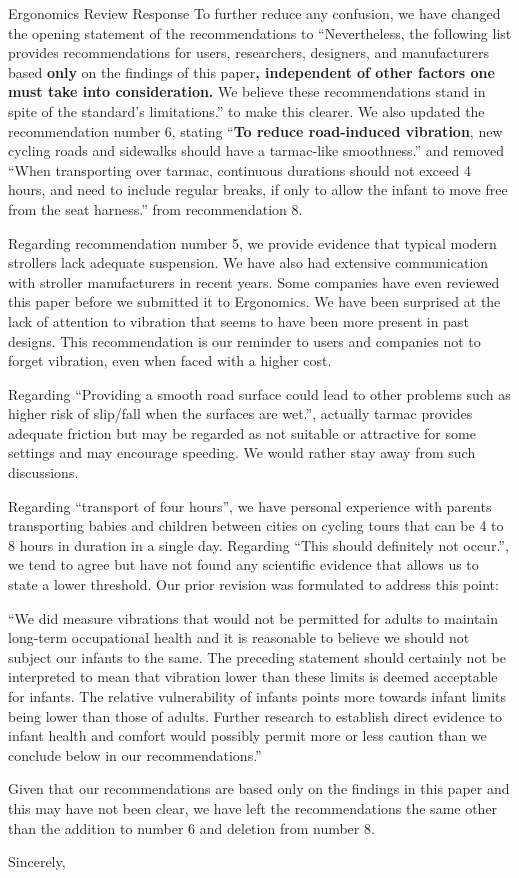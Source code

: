 \documentclass[a4paper]{letter}
\begin{document}
\begin{letter}{Ergonomics Review Response}
To further reduce any confusion, we have changed the opening statement of the
recommendations to ``Nevertheless, the following list provides recommendations
for users, researchers, designers, and manufacturers based \textbf{only} on the
findings of this paper\textbf{, independent of other factors one must take into
consideration.} We believe these recommendations stand in spite of the
standard's limitations.'' to make this clearer. We also updated the
recommendation number 6, stating ``\textbf{To reduce road-induced vibration},
new cycling roads and sidewalks should have a tarmac-like smoothness.'' and
removed ``When transporting over tarmac, continuous durations should not exceed
4 hours, and need to include regular breaks, if only to allow the infant to move
free from the seat harness.'' from recommendation 8.

Regarding recommendation number 5, we provide evidence that typical modern
strollers lack adequate suspension. We have also had extensive communication
with stroller manufacturers in recent years. Some companies have even reviewed
this paper before we submitted it to Ergonomics. We have been surprised at the
lack of attention to vibration that seems to have been more present in past
designs. This recommendation is our reminder to users and companies not to
forget vibration, even when faced with a higher cost.

Regarding ``Providing a smooth road surface could lead to other problems such as
higher risk of slip/fall when the surfaces are wet.'', actually tarmac provides
adequate friction but may be regarded as not suitable or attractive for some
settings and may encourage speeding. We would rather stay away from such
discussions. 

Regarding ``transport of four hours'', we have personal experience with parents
transporting babies and children between cities on cycling tours that can be 4
to 8 hours in duration in a single day. Regarding ``This should definitely not
occur.'', we tend to agree but have not found any scientific evidence that
allows us to state a lower threshold. Our prior revision was formulated to
address this point:

``We did measure vibrations that would not be permitted for adults to maintain
long-term occupational health and it is reasonable to believe we should not
subject our infants to the same. The preceding statement should certainly not be
interpreted to mean that vibration lower than these limits is deemed acceptable
for infants. The relative vulnerability of infants points more towards infant
limits being lower than those of adults. Further research to establish direct
evidence to infant health and comfort would possibly permit more or less caution
than we conclude below in our recommendations.''

Given that our recommendations are based only on the findings in this paper and
this may have not been clear, we have left the recommendations the same other
than the addition to number 6 and deletion from number 8.

\closing{Sincerely,}
\end{letter}
\end{document}
